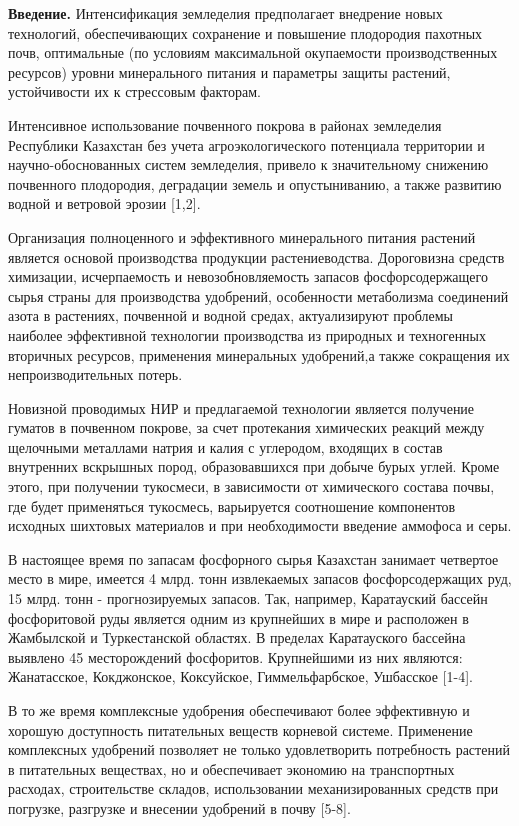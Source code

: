\begin{multicols}{2}
{\bfseries Введение.} Интенсификация земледелия предполагает внедрение
новых технологий, обеспечивающих сохранение и повышение плодородия
пахотных почв, оптимальные (по условиям максимальной окупаемости
производственных ресурсов) уровни минерального питания и параметры
защиты растений, устойчивости их к стрессовым факторам.

Интенсивное использование почвенного покрова в районах земледелия
Республики Казахстан без учета агроэкологического потенциала территории
и научно-обоснованных систем земледелия, привело к значительному
снижению почвенного плодородия, деградации земель и опустыниванию, а
также развитию водной и ветровой эрозии {[}1,2{]}.

Организация полноценного и эффективного минерального питания растений
является основой производства продукции растениеводства. Дороговизна
средств химизации, исчерпаемость и невозобновляемость запасов
фосфорсодержащего сырья страны для производства удобрений, особенности
метаболизма соединений азота в растениях, почвенной и водной средах,
актуализируют проблемы наиболее эффективной технологии производства из
природных и техногенных вторичных ресурсов, применения минеральных
удобрений,а также сокращения их непроизводительных потерь.

Новизной проводимых НИР и предлагаемой технологии является получение
гуматов в почвенном покрове, за счет протекания химических реакций между
щелочными металлами натрия и калия с углеродом, входящих в состав
внутренних вскрышных пород, образовавшихся при добыче бурых углей. Кроме
этого, при получении тукосмеси, в зависимости от химического состава
почвы, где будет применяться тукосмесь, варьируется соотношение
компонентов исходных шихтовых материалов и при необходимости введение
аммофоса и серы.

В настоящее время по запасам фосфорного сырья Казахстан занимает
четвертое место в мире, имеется 4 млрд. тонн извлекаемых запасов
фосфорсодержащих руд, 15 млрд. тонн - прогнозируемых запасов. Так,
например, Каратауский бассейн фосфоритовой руды является одним из
крупнейших в мире и расположен в Жамбылской и Туркестанской областях. В
пределах Каратауского бассейна выявлено 45 месторождений фосфоритов.
Крупнейшими из них являются: Жанатасское, Кокджонское, Коксуйское,
Гиммельфарбское, Ушбасское {[}1-4{]}.

В то же время комплексные удобрения обеспечивают более эффективную и
хорошую доступность питательных веществ корневой системе. Применение
комплексных удобрений позволяет не только удовлетворить потребность
растений в питательных веществах, но и обеспечивает экономию на
транспортных расходах, строительстве складов, использовании
механизированных средств при погрузке, разгрузке и внесении удобрений в
почву {[}5-8{]}.


\end{multicols}

